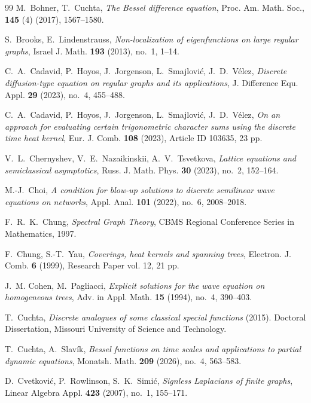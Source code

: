 \documentclass[reqno,10pt]{amsart}
\theoremstyle{definition}
\numberwithin{equation}{section}
\begin{document}
\begin{thebibliography}{99}
  M.~Bohner, T.~Cuchta, \textit{The Bessel difference equation}, Proc. Am. Math. Soc., \textbf{145} (4) (2017), 1567--1580.

 S.~Brooks, E.~Lindenstrauss, \textit{Non-localization of eigenfunctions on large regular graphs}, Israel J. Math. \textbf{193} (2013), no.~1, 1--14.

C.~A.~Cadavid, P.~Hoyos, J.~Jorgenson, L.~Smajlovi\'{c}, J.~D.~V\'{e}lez, \textit{Discrete diffusion-type equation on regular graphs and its applications}, J. Difference Equ. Appl. \textbf{29} (2023), no.~4, 455--488.

 C.~A.~Cadavid, P.~Hoyos, J.~Jorgenson, L.~Smajlovi\'{c}, J.~D.~V\'{e}lez, \textit{On an approach for evaluating certain trigonometric character sums using the discrete time heat kernel}, Eur. J. Comb. \textbf{108} (2023), Article ID 103635, 23 pp.

 V.~L.~Chernyshev, V.~E.~Nazaikinskii, A.~V.~Tsvetkova, \textit{Lattice equations and semiclassical asymptotics}, Russ. J. Math. Phys. \textbf{30} (2023), no.~2, 152--164.

 M.-J.~Choi, \textit{A condition for blow-up solutions to discrete semilinear wave equations on networks}, Appl. Anal. \textbf{101} (2022), no.~6, 2008--2018.

F.~R.~K.~Chung, \textit{Spectral Graph Theory}, CBMS Regional Conference Series in Mathematics, 1997.

 F.~Chung, S.-T.~Yau, \textit{Coverings, heat kernels and spanning trees}, Electron. J. Comb. \textbf{6} (1999), Research Paper vol. 12, 21 pp.

 J.~M. Cohen, M.~Pagliacci, \textit{Explicit solutions for
the wave equation on homogeneous trees}, Adv. in Appl. Math. \textbf{15}
(1994), no.~4, 390--403.

 T.~Cuchta, \textit{Discrete analogues of some classical special
functions} (2015). Doctoral Dissertation, Missouri University of Science and
Technology.

 T.~Cuchta, A.~Slav\'ik, \textit{Bessel functions on time scales and applications to partial dynamic equations}, Monatsh. Math. \textbf{209} (2026), no.~4, 563--583.

 D.~Cvetkovi\'{c}, P.~Rowlinson, S.~K.~Simi\'{c}, \textit{Signless Laplacians of finite graphs}, Linear Algebra Appl. \textbf{423} (2007), no.~1, 155--171.


\end{thebibliography}
\end{document}

